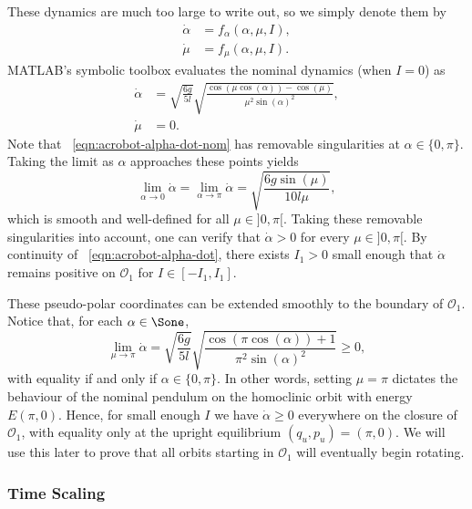 These dynamics are much too large to write out, so we simply denote them by
\begin{align}
    \label{eqn:acrobot-alpha-dot}
    \dot{\alpha} &= f_\alpha(\alpha,\mu,I)
    ,\\
    \label{eqn:acrobot-mu-dot}
    \dot{\mu} &= f_\mu(\alpha,\mu,I)
    .
\end{align}
MATLAB's symbolic toolbox evaluates the nominal dynamics (when \(I = 0\)) as
\begin{align}
    \label{eqn:acrobot-alpha-dot-nom}
    \dot{\alpha} &= \sqrt{\frac{6g}{5l}} 
        \sqrt{\frac{\cos(\mu\cos(\alpha)) - \cos(\mu)}
            {\mu^2 \sin(\alpha)^2}}
    , \\
    \label{eqn:acrobot-mu-dot-nom}
    \dot{\mu} &= 0
    .
\end{align}
Note that ~\eqref{eqn:acrobot-alpha-dot-nom} has removable singularities at
\(\alpha \in \{0,\pi\}\).
Taking the limit as \(\alpha\) approaches these points yields
\[
    \lim \limits_{\alpha \to 0}\dot{\alpha} 
    = \lim \limits_{\alpha \to \pi} \dot{\alpha}
    = \sqrt{\frac{6g \sin(\mu)}{10l \mu}}
    ,
\]
which is smooth and well-defined for all \(\mu \in ]0,\pi[\).
Taking these removable singularities into account,
one can verify that \(\dot{\alpha} > 0\) for every \(\mu \in ]0,\pi[\).
By continuity of ~\eqref{eqn:acrobot-alpha-dot}, there exists \(I_1 > 0\) small
enough that \(\dot{\alpha}\) remains positive on \(\mathcal{O}_1\) for 
\(I \in [-I_1,I_1]\). 

These pseudo-polar coordinates can be extended smoothly to 
the boundary of \(\mathcal{O}_1\).
Notice that, for each \(\alpha \in \Sone\),
\begin{equation}\label{eqn:alpha-dot-boundary}
    \lim \limits_{\mu \to \pi} \dot{\alpha}
    = \sqrt{\frac{6g}{5l}} 
        \sqrt{\frac{\cos(\pi\cos(\alpha)) + 1}
            {\pi^2 \sin(\alpha)^2}}
    \geq 0
    ,
\end{equation}
with equality if and only if \(\alpha \in \{0,\pi\}\).
In other words, setting \(\mu = \pi\) dictates the behaviour of
the nominal pendulum on the homoclinic orbit with energy \(E(\pi,0)\).
Hence, for small enough \(I\) we have \(\dot{\alpha} \geq 0\) everywhere on the 
closure of \(\mathcal{O}_1\), with equality only at the upright
equilibrium \((q_u,p_u) = (\pi,0)\).
We will use this later to prove that all orbits starting in
\(\mathcal{O}_1\) will eventually begin rotating.

\subsubsection*{Time Scaling}


